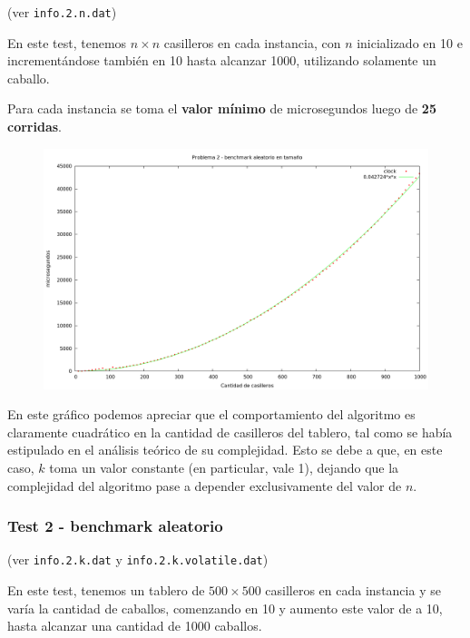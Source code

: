 (ver \verb|info.2.n.dat|) \medskip

En este test, tenemos $n \times n$ casilleros en cada instancia, con $n$
inicializado en 10 e incrementándose también en 10 hasta alcanzar 1000,
utilizando solamente un caballo.

Para cada instancia se toma el \textbf{valor mínimo} de microsegundos luego de
\textbf{25 corridas}.

\vspace*{0.5cm}

\begin{figure}[h]
  \begin{center}
    \includegraphics[scale=0.35]{imagenes/grafico-2-n.png}
  \end{center}
\end{figure}

\vspace*{0.5cm}

En este gráfico podemos apreciar que el comportamiento del algoritmo es
claramente cuadrático en la cantidad de casilleros del tablero, tal como se
había estipulado en el análisis teórico de su complejidad. Esto se debe a que,
en este caso, $k$ toma un valor constante (en particular, vale 1), dejando que
la complejidad del algoritmo pase a depender exclusivamente del valor de $n$.


\newpage
\subsubsection{Test 2 - benchmark aleatorio}

(ver \verb|info.2.k.dat| y \verb|info.2.k.volatile.dat|) \medskip

En este test, tenemos un tablero de $500 \times 500$ casilleros en cada
instancia y se varía la cantidad de caballos, comenzando en 10 y aumento este
valor de a 10, hasta alcanzar una cantidad de 1000 caballos.

